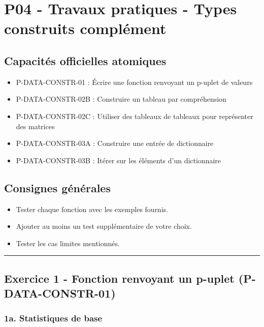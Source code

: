 \section{P04 - Travaux pratiques - Types construits complément}

\subsection{Capacités officielles atomiques}

\begin{itemize}
\tightlist
\item
  P-DATA-CONSTR-01 : Écrire une fonction renvoyant un p-uplet de valeurs
\item
  P-DATA-CONSTR-02B : Construire un tableau par compréhension
\item
  P-DATA-CONSTR-02C : Utiliser des tableaux de tableaux pour représenter
  des matrices
\item
  P-DATA-CONSTR-03A : Construire une entrée de dictionnaire
\item
  P-DATA-CONSTR-03B : Itérer sur les éléments d'un dictionnaire
\end{itemize}

\subsection{Consignes générales}

\begin{itemize}
\tightlist
\item
  Tester chaque fonction avec les exemples fournis.
\item
  Ajouter au moins un test supplémentaire de votre choix.
\item
  Tester les cas limites mentionnés.
\end{itemize}

\begin{center}\rule{0.5\linewidth}{0.5pt}\end{center}

\subsection{Exercice 1 - Fonction renvoyant un p-uplet (P-DATA-CONSTR-01)}

\subsubsection{1a. Statistiques de base}

